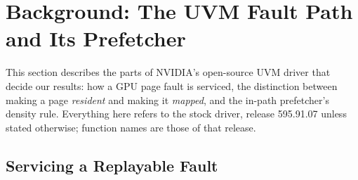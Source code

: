 
\section{Background: The UVM Fault Path and Its Prefetcher}
\label{sec:background}

This section describes the parts of NVIDIA's open-source UVM driver that
decide our results: how a GPU page fault is serviced, the distinction between
making a page \emph{resident} and making it \emph{mapped}, and the in-path
prefetcher's density rule. Everything here refers to the stock driver,
release 595.91.07 unless stated otherwise; function names are those of that
release.

\subsection{Servicing a Replayable Fault}
\label{sec:bg-fault-path}

